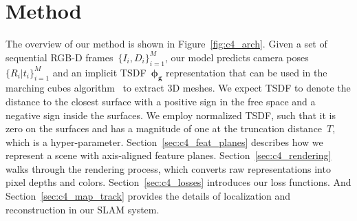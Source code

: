 \section{Method}
The overview of our method is shown in Figure~\ref{fig:c4_arch}. Given a set of sequential RGB-D frames~$\{I_{i}, D_{i}\}_{i=1}^M$, our model predicts camera poses~$\{R_{i}| t_{i}\}_{i=1}^M$ and an implicit TSDF~$\boldsymbol{\phi_{g}}$ representation that can be used in the marching cubes algorithm~\citep{lorensen1987marching} to extract 3D meshes. We expect TSDF to denote the distance to the closest surface with a positive sign in the free space and a negative sign inside the surfaces. We employ normalized TSDF, such that it is zero on the surfaces and has a magnitude of one at the truncation distance~$T$, which is a hyper-parameter. Section~\ref{sec:c4_feat_planes} describes how we represent a scene with axis-aligned feature planes. Section~\ref{sec:c4_rendering} walks through the rendering process, which converts raw representations into pixel depths and colors. Section~\ref{sec:c4_losses} introduces our loss functions. And Section~\ref{sec:c4_map_track} provides the details of localization and reconstruction in our SLAM system.

